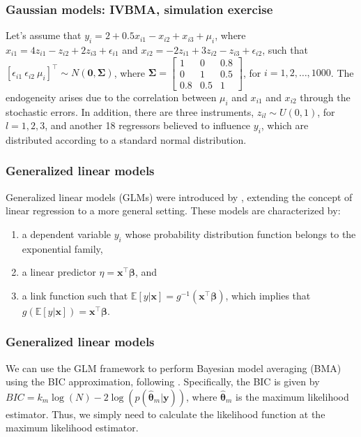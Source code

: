 \documentclass[12pt, compress]{beamer}
\begin{document}
\begin{frame}
	\frametitle{Gaussian models: IVBMA, simulation exercise}
Let's assume that $y_i = 2 + 0.5x_{i1} - x_{i2} + x_{i3} + \mu_i$, where $x_{i1} = 4z_{i1} - z_{i2} + 2z_{i3} + \epsilon_{i1}$ and $x_{i2} = -2z_{i1} + 3z_{i2} - z_{i3} + \epsilon_{i2}$, such that $[\epsilon_{i1} \ \epsilon_{i2} \ \mu_i]^{\top} \sim N(\bm{0}, \bm{\Sigma})$, where $\bm{\Sigma} = \begin{bmatrix} 1 & 0 & 0.8 \\ 0 & 1 & 0.5 \\ 0.8 & 0.5 & 1 \end{bmatrix}$, for $i = 1, 2, \dots, 1000$. The endogeneity arises due to the correlation between $\mu_i$ and $x_{i1}$ and $x_{i2}$ through the stochastic errors. In addition, there are three instruments, $z_{il} \sim U(0,1)$, for $l = 1, 2, 3$, and another 18 regressors believed to influence $y_i$, which are distributed according to a standard normal distribution.
\end{frame}

\begin{frame}
	\frametitle{Generalized linear models}
Generalized linear models (GLMs) were introduced by \cite{nelder1972generalized}, extending the concept of linear regression to a more general setting. These models are characterized by:
\begin{enumerate}
    \item a dependent variable $y_i$ whose probability distribution function belongs to the exponential family,
    \item a linear predictor $\eta = \bm{x}^{\top}\bm{\beta}$, and
    \item a link function such that $\mathbb{E}[y|\bm{x}] = g^{-1}(\bm{x}^{\top}\bm{\beta})$, which implies that $g(\mathbb{E}[y|\bm{x}]) = \bm{x}^{\top}\bm{\beta}$. 
\end{enumerate}
\end{frame}

\begin{frame}
	\frametitle{Generalized linear models}
We can use the GLM framework to perform Bayesian model averaging (BMA) using the BIC approximation, following \cite{Raftery1995}. Specifically, the BIC is given by $BIC = k_m \log(N) - 2 \log(p(\hat{\bm{\theta}}_m | \bm{y}))$, where $\hat{\bm{\theta}}_m$ is the maximum likelihood estimator. Thus, we simply need to calculate the likelihood function at the maximum likelihood estimator.
\end{frame}
\end{document}
